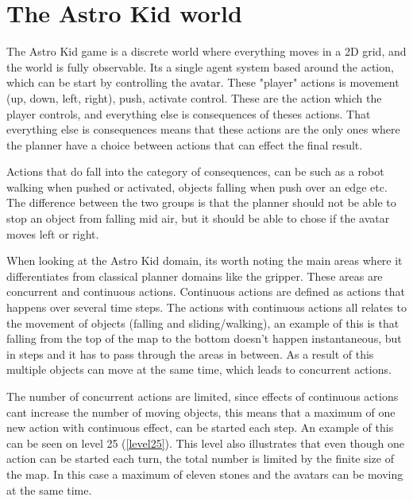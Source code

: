 	\chapter{The Astro Kid world}
	The Astro Kid game is a discrete world where everything moves in a 2D grid, and the world is fully observable. Its a single agent system based around the action, which can be start by controlling the avatar. These "player" actions is movement (up, down, left, right), push, activate control. These are the action which the player controls, and everything else is consequences of theses actions. That everything else is consequences means that these actions are the only ones where the planner have a choice between actions that can effect the final result. 
	
	
	Actions that do fall into the category of consequences, can be such as a robot walking when pushed or activated, objects falling when push over an edge etc. The difference between the two groups is that the planner should not be able to stop an object from falling mid air, but it should be able to chose if the avatar moves left or right. 
	
	When looking at the Astro Kid domain, its worth noting the main areas where it differentiates from classical planner domains like the gripper. These areas are concurrent and continuous actions. Continuous actions are defined as actions that happens over several time steps. 
	The actions with continuous actions all relates to the movement of objects (falling and sliding/walking), an example of this is that falling from the top of the map to the bottom doesn't happen instantaneous, but in steps and it has to pass through the areas in between. As a result of this multiple objects can move at the same time, which leads to concurrent actions.
	
	The number of concurrent actions are limited, since effects of continuous actions cant increase the number of moving objects, this means that a maximum of one new action with continuous effect, can be started each step. An example of this can be seen on level 25 (\ref{level25}). This level also illustrates that even though one action can be started each turn, the total number is limited by the finite size of the map. In this case a maximum of eleven stones and the avatars can be moving at the same time.

